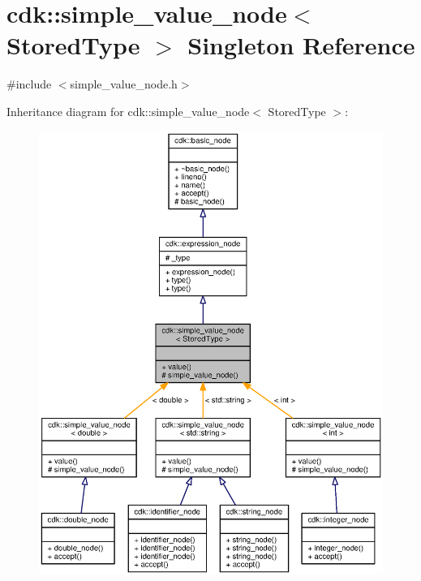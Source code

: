 \section{cdk\+:\+:simple\+\_\+value\+\_\+node$<$ Stored\+Type $>$ Singleton Reference}
\label{classcdk_1_1simple__value__node}


{\ttfamily \#include $<$simple\+\_\+value\+\_\+node.\+h$>$}



Inheritance diagram for cdk\+:\+:simple\+\_\+value\+\_\+node$<$ Stored\+Type $>$\+:
\nopagebreak
\begin{figure}[H]
\begin{center}
\leavevmode
\includegraphics[width=350pt]{classcdk_1_1simple__value__node__inherit__graph}
\end{center}
\end{figure}


